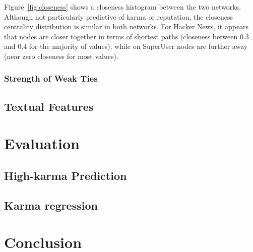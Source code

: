 \documentclass[11pt]{article}
\begin{document}
Figure~\ref{fig:closeness} shows a closeness histogram between the two networks.
Although not particularly predictive of karma or reputation, the closeness
centrality distribution is similar in both networks. For Hacker News, it appears
that nodes are closer together in terms of shortest paths (closeness between
$0.3$ and $0.4$ for the majority of values), while on SuperUser nodes are
further away (near zero closeness for most values).


\subsubsection{Strength of Weak Ties}


\subsection{Textual Features}


\section{Evaluation}

\subsection{High-karma Prediction}

\subsection{Karma regression}

\section{Conclusion}

{} 
\end{document}
